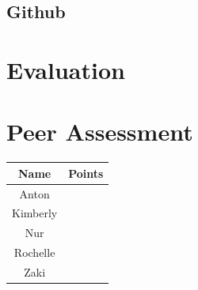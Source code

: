 \documentclass{article}
\begin{document}
	
	\subsection{Github}
\section{Evaluation}
	
	
\section{Peer Assessment}
\begin{tabular}{|c|c|}
	\hline Name & Points \\ 
	\hline Anton &  \\ 
	\hline Kimberly &  \\ 
	\hline Nur &  \\ 
	\hline Rochelle &  \\ 
	\hline  Zaki &  \\ 
	\hline 
\end{tabular} 
	


\end{document}
